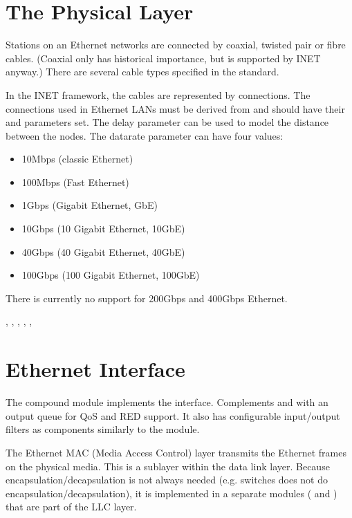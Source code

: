 \section{The Physical Layer}
\label{sec:ethernet:the-physical-layer}

Stations on an Ethernet networks are connected by coaxial,
twisted pair or fibre cables. (Coaxial only has historical importance,
but is supported by INET anyway.) There are several cable types specified
in the standard.

In the INET framework, the cables are represented by connections.
The connections used in Ethernet LANs must be derived from
 and should have their  and
 parameters set.
The delay parameter can be used to model the distance between the
nodes. The datarate parameter can have four values:

\begin{itemize}
  \item 10Mbps (classic Ethernet)
  \item 100Mbps (Fast Ethernet)
  \item 1Gbps (Gigabit Ethernet, GbE)
  \item 10Gbps (10 Gigabit Ethernet, 10GbE)
  \item 40Gbps (40 Gigabit Ethernet, 40GbE)
  \item 100Gbps (100 Gigabit Ethernet, 100GbE)
\end{itemize}

There is currently no support for 200Gbps and 400Gbps Ethernet.

, , , ,
, 

\section{Ethernet Interface}
\label{sec:ethernet:ethernet-interface}

The  compound module implements the 
interface. Complements  and  with an output queue
for QoS and RED support. It also has configurable input/output filters as 
components similarly to the  module.

The Ethernet MAC (Media Access Control) layer transmits the Ethernet frames on
the physical media. This is a sublayer within the data link layer. Because
encapsulation/decapsulation is not always needed (e.g. switches does not do
encapsulation/decapsulation), it is implemented in a separate modules
( and ) that are part of the LLC layer.


